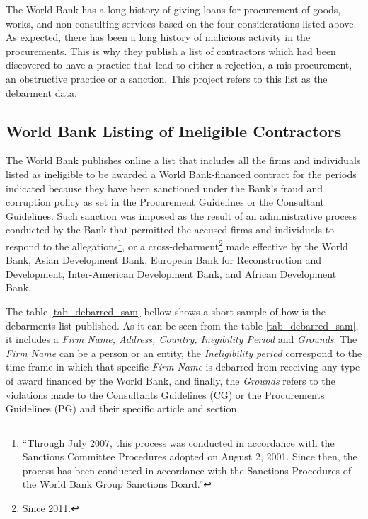 The World Bank has a long history of giving loans for procurement of goods, works, and non-consulting services based on the four considerations listed above. As expected, there has been a long history of malicious activity in the procurements. This is why they publish a list of contractors which had been discovered to have a practice that lead to either a rejection, a mis-procurement, an obstructive practice or a sanction. This project refers to this list as the debarment data.

\subsection{World Bank Listing of Ineligible Contractors}

The World Bank publishes online \parencite{wb_debarment} a list that includes all the firms and individuals listed as ineligible to be awarded a World Bank-financed contract for the periods indicated because they have been sanctioned under the Bank's fraud and corruption policy as set in the Procurement Guidelines or the Consultant Guidelines.  Such sanction was imposed as the result of an administrative process conducted by the Bank that permitted the accused firms and individuals to respond to the allegations\footnote{``Through July 2007, this process was conducted in accordance with the Sanctions Committee Procedures adopted on August 2, 2001. Since then, the process has been conducted in accordance with the Sanctions Procedures of the World Bank Group Sanctions Board.''}, or a cross-debarment\footnote{ Since 2011.} made effective by the World Bank, Asian Development Bank, European Bank for Reconstruction and Development, Inter-American Development Bank, and African Development Bank.

The table \ref{tab_debarred_sam} bellow shows a short sample of how is the debarments list published. As it can be seen from the table \ref{tab_debarred_sam}, it includes a \textit{Firm Name, Address, Country, Inegibility Period} and \textit{Grounds}. The \textit{Firm Name} can be a person or an entity, the \textit{Ineligibility period} correspond to the time frame in which that specific \textit{Firm Name} is debarred from receiving any type of award financed by the World Bank, and finally, the \textit{Grounds} refers to the violations made to the Consultants Guidelines (CG) or the Procurements Guidelines (PG) and their specific article and section.

